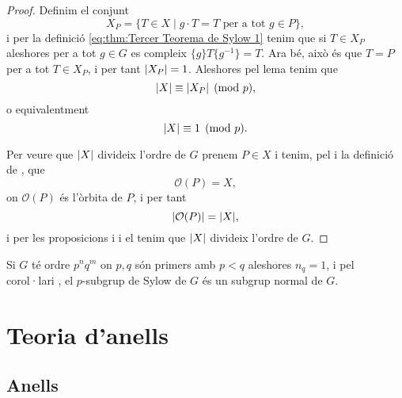 \documentclass[../Apunts.tex]{subfiles}
\begin{document}
\begin{theorem}
\begin{proof}
			Definim el conjunt
			\[X_{P}=\{T\in X\mid g\cdot T=T\text{ per a tot }g\in P\},\]
			i per la definició \eqref{eq:thm:Tercer Teorema de Sylow 1} tenim que si \(T\in X_{P}\) aleshores per a tot \(g\in G\) es compleix \(\{g\}T\{g^{-1}\}=T\). Ara bé, això és que \(T=P\) per a tot \(T\in X_{P}\), i per tant \(\abs{X_{P}}=1\). Aleshores pel lema  tenim que
			\[\abs{X}\equiv\abs{X_{P}}\pmod{p},\]
			o equivalentment
			\[\abs{X}\equiv1\pmod{p}.\]
			
			Per veure que \(\abs{X}\) divideix l'ordre de \(G\) prenem \(P\in X\) i tenim, pel  i la definició de , que
			\[\mathcal{O}(P)=X,\]
			on \(\mathcal{O}(P)\) és l'òrbita de \(P\), i per tant
			\[\abs{\mathcal{O}(P)}=\abs{X},\]
			i per les proposicions  i  i el  tenim que \(\abs{X}\) divideix l'ordre de \(G\).
		\end{proof}
	\end{theorem}
	\begin{corollary}
		Si \(G\) té ordre \(p^{n}q^{m}\) on \(p,q\) són primers amb \(p<q\) aleshores \(n_{q}=1\), i pel corol·lari , el \(p\)-subgrup de Sylow de \(G\) és un subgrup normal de \(G\).
	\end{corollary}
\chapter{Teoria d'anells}
	\section{Anells}
\end{document}
